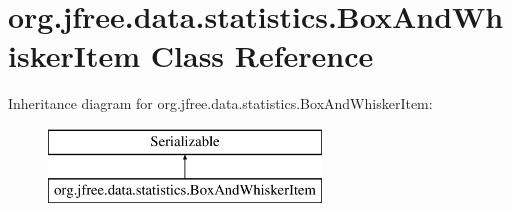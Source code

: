 \hypertarget{classorg_1_1jfree_1_1data_1_1statistics_1_1_box_and_whisker_item}{}\section{org.\+jfree.\+data.\+statistics.\+Box\+And\+Whisker\+Item Class Reference}
\label{classorg_1_1jfree_1_1data_1_1statistics_1_1_box_and_whisker_item}
Inheritance diagram for org.\+jfree.\+data.\+statistics.\+Box\+And\+Whisker\+Item\+:\begin{figure}[H]
\begin{center}
\leavevmode
\includegraphics[height=2.000000cm]{classorg_1_1jfree_1_1data_1_1statistics_1_1_box_and_whisker_item}
\end{center}
\end{figure}
